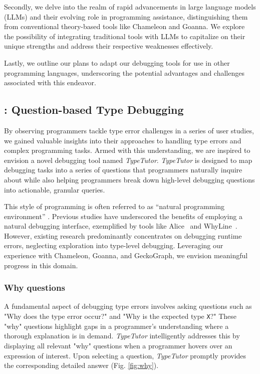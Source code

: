 Secondly, we delve into the realm of rapid advancements in large language models (LLMs) and their evolving role in programming assistance, distinguishing them from conventional theory-based tools like Chameleon and Goanna. We explore the possibility of integrating traditional tools with LLMs to capitalize on their unique strengths and address their respective weaknesses effectively.

Lastly, we outline our plans to adapt our debugging tools for use in other programming languages, underscoring the potential advantages and challenges associated with this endeavor.

\subsection{\typetutor: Question-based Type Debugging}
By observing programmers tackle type error challenges in a series of user studies, we gained valuable insights into their approaches to handling type errors and complex programming tasks. Armed with this understanding, we are inspired to envision a novel debugging tool named \textit{TypeTutor}. \textit{TypeTutor} is designed to map debugging tasks into a series of questions that programmers naturally inquire about while also helping programmers break down high-level debugging questions into actionable, granular queries.

This style of programming is often referred to as ``natural programming environment'' \cite{Myers2004-fy}. Previous studies have underscored the benefits of employing a natural debugging interface, exemplified by tools like Alice~\cite{Conway2000-nn} and WhyLine~\cite{Ko2009-uf}. However, existing research predominantly concentrates on debugging runtime errors, neglecting exploration into type-level debugging.  Leveraging our experience with Chameleon, Goanna, and GeckoGraph, we envision meaningful progress in this domain.


\subsubsection{Why questions}

A fundamental aspect of debugging type errors involves asking questions such as "Why does the type error occur?" and "Why is the expected type \texttt{X}?" These "why" questions highlight gaps in a programmer's understanding where a thorough explanation is in demand. \textit{TypeTutor} intelligently addresses this by displaying all relevant "why" questions when a programmer hovers over an expression of interest. Upon selecting a question, \textit{TypeTutor} promptly provides the corresponding detailed answer (Fig. \ref{fig:why}).



